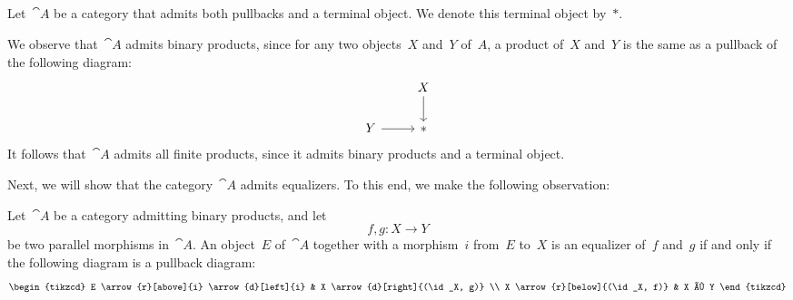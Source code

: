\subsection{}

Let~$\cat{A}$ be a category that admits both pullbacks and a terminal object.
We denote this terminal object by~$\ast$.

We observe that~$\cat{A}$ admits binary products, since for any two objects~$X$ and~$Y$ of~$A$, a product of~$X$ and~$Y$ is the same as a pullback of the following diagram:
\[
	\begin{tikzcd}
		{}
		&
		X
		\arrow{d}
		\\
		Y
		\arrow{r}
		&
		\ast
	\end{tikzcd}
\]
It follows that~$\cat{A}$ admits all finite products, since it admits binary products and a terminal object.

Next, we will show that the category~$\cat{A}$ admits equalizers.
To this end, we make the following observation:

\begin{proposition*}
	\label{equalizers via pushouts}
	Let~$\cat{A}$ be a category admitting binary products, and let
	\[
		f, g \colon X \to Y
	\]
	be two parallel morphisms in~$\cat{A}$.
	An object~$E$ of~$\cat{A}$ together with a morphism~$i$ from~$E$ to~$X$ is an equalizer of~$f$ and~$g$ if and only if the following diagram is a pullback diagram:
	\[
		\begin{tikzcd}
			E
			\arrow{r}[above]{i}
			\arrow{d}[left]{i}
			&
			X
			\arrow{d}[right]{(\id_X, g)}
			\\
			X
			\arrow{r}[below]{(\id_X, f)}
			&
			X × Y
		\end{tikzcd}
	\]
\end{proposition*}

